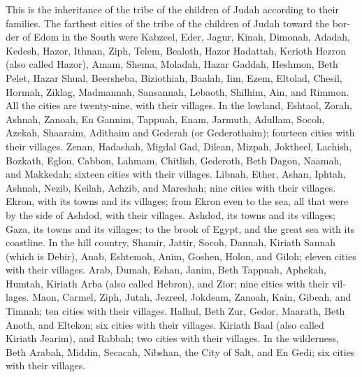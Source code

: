 \begin{paracol}{2}
\begin{otherlanguage}{english}
 This is the inheritance of the tribe of the children of
Judah according to their families.  The farthest cities
of the tribe of the children of Judah toward the border of Edom in the
South were Kabzeel, Eder, Jagur,  Kinah, Dimonah, Adadah,
 Kedesh, Hazor, Ithnan,  Ziph, Telem,
Bealoth,  Hazor Hadattah, Kerioth Hezron (also called
Hazor),  Amam, Shema, Moladah,  Hazar
Gaddah, Heshmon, Beth Pelet,  Hazar Shual, Beersheba,
Biziothiah,  Baalah, Iim, Ezem,  Eltolad,
Chesil, Hormah,  Ziklag, Madmannah, Sansannah,
 Lebaoth, Shilhim, Ain, and Rimmon. All the cities are
twenty-nine, with their villages.  In the lowland,
Eshtaol, Zorah, Ashnah,  Zanoah, En Gannim, Tappuah,
Enam,  Jarmuth, Adullam, Socoh, Azekah, 
Shaaraim, Adithaim and Gederah (or Gederothaim); fourteen cities with
their villages.  Zenan, Hadashah, Migdal Gad,
 Dilean, Mizpah, Joktheel,  Lachish,
Bozkath, Eglon,  Cabbon, Lahmam, Chitlish,
 Gederoth, Beth Dagon, Naamah, and Makkedah; sixteen
cities with their villages.  Libnah, Ether, Ashan,
 Iphtah, Ashnah, Nezib,  Keilah, Achzib,
and Mareshah; nine cities with their villages.  Ekron,
with its towns and its villages;  from Ekron even to the
sea, all that were by the side of Ashdod, with their villages.
 Ashdod, its towns and its villages; Gaza, its towns and
its villages; to the brook of Egypt, and the great sea with its
coastline.  In the hill country, Shamir, Jattir, Socoh,
 Dannah, Kiriath Sannah (which is Debir), 
Anab, Eshtemoh, Anim,  Goshen, Holon, and Giloh; eleven
cities with their villages.  Arab, Dumah, Eshan,
 Janim, Beth Tappuah, Aphekah,  Humtah,
Kiriath Arba (also called Hebron), and Zior; nine cities with their
villages.  Maon, Carmel, Ziph, Jutah, 
Jezreel, Jokdeam, Zanoah,  Kain, Gibeah, and Timnah; ten
cities with their villages.  Halhul, Beth Zur, Gedor,
 Maarath, Beth Anoth, and Eltekon; six cities with their
villages.  Kiriath Baal (also called Kiriath Jearim), and
Rabbah; two cities with their villages.  In the
wilderness, Beth Arabah, Middin, Secacah,  Nibshan, the
City of Salt, and En Gedi; six cities with their villages.


\end{otherlanguage}
\end{paracol}
